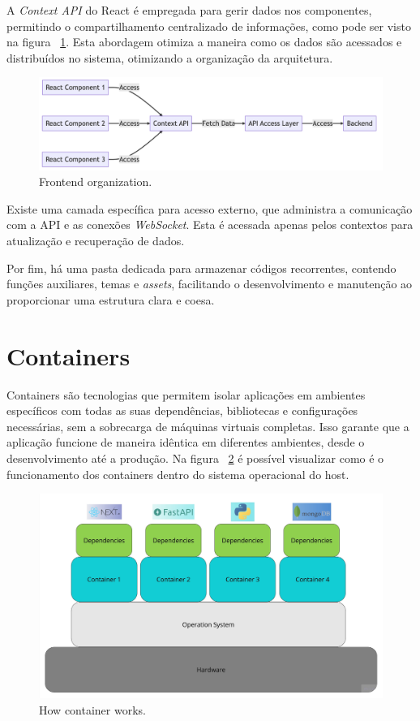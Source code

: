 A \textit{Context API} do React é empregada para gerir dados nos componentes, permitindo o compartilhamento centralizado de informações, como pode ser visto na figura ~\ref{fig:FrontendOrganization}. Esta abordagem otimiza a maneira como os dados são acessados e distribuídos no sistema, otimizando a organização da arquitetura.

\begin{figure}[htbp]
	\centering
	\includegraphics[width=\textwidth]{images/components_frontend.png}
	\caption{Frontend organization.}
	\label{fig:FrontendOrganization}
\end{figure}

Existe uma camada específica para acesso externo, que administra a comunicação com a API e as conexões \textit{WebSocket}. Esta é acessada apenas pelos contextos para atualização e recuperação de dados.

Por fim, há uma pasta dedicada para armazenar códigos recorrentes, contendo funções auxiliares, temas e \textit{assets}, facilitando o desenvolvimento e manutenção ao proporcionar uma estrutura clara e coesa.


\section{Containers}

Containers são tecnologias que permitem isolar aplicações em ambientes específicos com todas as suas dependências, bibliotecas e configurações necessárias, sem a sobrecarga de máquinas virtuais completas. Isso garante que a aplicação funcione de maneira idêntica em diferentes ambientes, desde o desenvolvimento até a produção. Na figura ~\ref{fig:container} é possível visualizar como é o funcionamento dos containers dentro do sistema operacional do  host.

\begin{figure}[htbp]
	\centering
	\includegraphics[width=\textwidth]{images/container.jpg}
	\caption{How container works.}
	\label{fig:container}
\end{figure}


